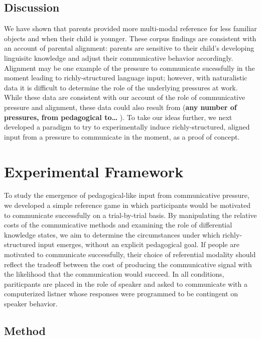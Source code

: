 \documentclass[10pt, letterpaper]{article}
\begin{document}
\subsection{Discussion}\label{discussion}

We have shown that parents provided more multi-modal reference for less
familiar objects and when their child is younger. These corpus findings
are consistent with an account of parental alignment: parents are
sensitive to their child's developing linguisitc knowledge and adjust
their communicative behavior accordingly. Alignment may be one example
of the pressure to communicate sucessfully in the moment leading to
richly-structured language input; however, with naturalistic data it is
difficult to determine the role of the underlying pressures at work.
While these data are consistent with our account of the role of
communicative pressure and alignment, these data could also result from
(\textbf{any number of pressures, from pedagogical to\ldots{} }). To
take our ideas further, we next developed a paradigm to try to
experimentally induce richly-structured, aligned input from a pressure
to communicate in the moment, as a proof of concept.

\section{Experimental Framework}\label{experimental-framework}

To study the emergence of pedagogical-like input from communicative
pressure, we developed a simple reference game in which participants
would be motivated to communicate successfully on a trial-by-trial
basis. By manipulating the relative costs of the communicative methods
and examining the role of differential knowledge states, we aim to
determine the circumstances under which richly-structured input emerges,
without an explicit pedagogical goal. If people are motivated to
communicate successfully, their choice of referential modality should
reflect the tradeoff between the cost of producing the communicative
signal with the likelihood that the communication would succeed. In all
conditions, pariticpants are placed in the role of speaker and asked to
communicate with a computerized listner whose responses were programmed
to be contingent on speaker behavior.

\subsection{Method}\label{method}
\end{document}

